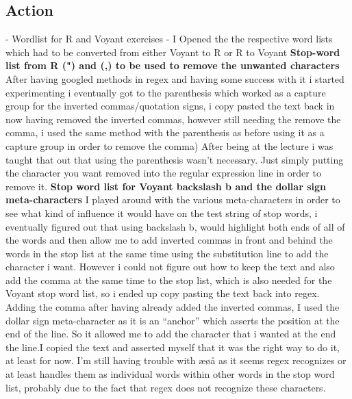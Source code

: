\documentclass{article}
\begin{document}
\subsection{Action}
\newline
\newline
- Wordlist for R and Voyant exercises
\newline
\newline
- I Opened the the respective word lists which had to be converted from either Voyant to R or R to Voyant
\newline
\newline
\textbf{Stop-word list from R (") and (,) to be used to remove the unwanted characters}
After having googled methods  in regex and having some success with it i started experimenting i eventually got to the parenthesis which worked as a capture group for the inverted commas/quotation signs, i copy pasted the text back in now having removed the inverted commas, however still needing the remove the comma, i used the same method with the parenthesis as before using it as a capture group in order to remove the comma) 
After being at the lecture i was taught that out that using the parenthesis wasn't necessary.  Just simply putting the character you want removed into the regular expression line in order to remove it.
\newline
\newline
\textbf{Stop word list for Voyant backslash  b and the dollar sign meta-characters}
I played around with the various meta-characters in order to see  what kind of influence it would have on the test string of stop words, i eventually figured out that using backslash b, would highlight both ends of all of the words and then allow me to add inverted commas in front and behind the words in the stop list at the same time using the substitution line to add the character i want. However i could not figure out how to keep the text and also add the comma at the same time to the stop list, which is also needed for the Voyant stop word list, so i ended up copy pasting the text back into regex.
Adding the comma after having already added the inverted commas, I used the dollar sign meta-character as it is an “anchor” which asserts the position at the end of the line. So it allowed me to add the character that i wanted at the end the line.I copied the text and asserted myself that it was the right way to do it, at least for now. I'm still having trouble with æøå as it seems regex recognizes or at least handles them as individual words within other words in the stop word list, probably due to the fact that regex does not recognize these characters.
\end{document}
